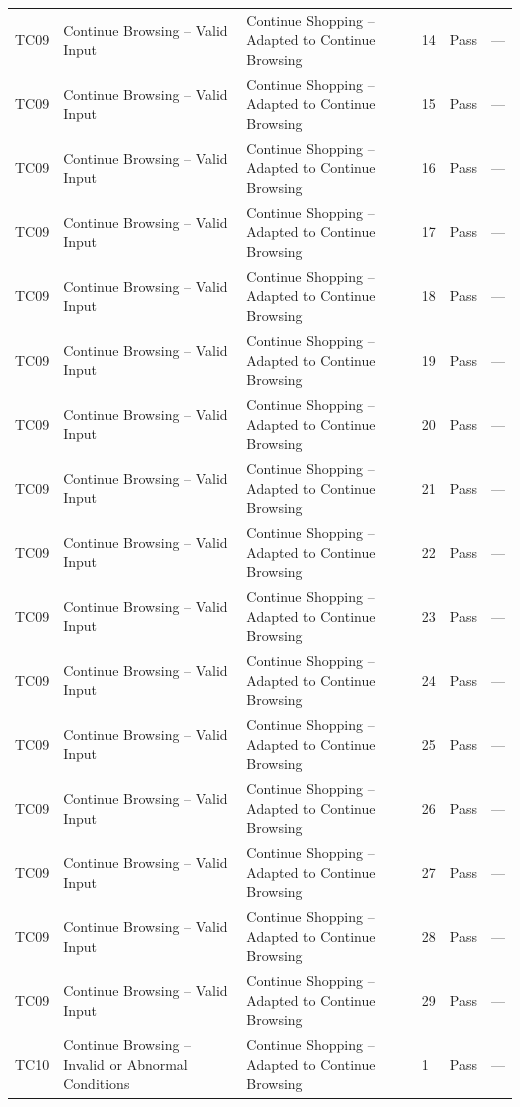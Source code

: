 {\begin{longtable}{@{}p{1.2cm} p{4.2cm} p{4.4cm} p{0.8cm} p{0.9cm} p{1.6cm}@{}}
  TC09 & Continue Browsing -- Valid Input & Continue Shopping -- Adapted to Continue Browsing & 14 & Pass & --- \\
  TC09 & Continue Browsing -- Valid Input & Continue Shopping -- Adapted to Continue Browsing & 15 & Pass & --- \\
  TC09 & Continue Browsing -- Valid Input & Continue Shopping -- Adapted to Continue Browsing & 16 & Pass & --- \\
  TC09 & Continue Browsing -- Valid Input & Continue Shopping -- Adapted to Continue Browsing & 17 & Pass & --- \\
  TC09 & Continue Browsing -- Valid Input & Continue Shopping -- Adapted to Continue Browsing & 18 & Pass & --- \\
  TC09 & Continue Browsing -- Valid Input & Continue Shopping -- Adapted to Continue Browsing & 19 & Pass & --- \\
  TC09 & Continue Browsing -- Valid Input & Continue Shopping -- Adapted to Continue Browsing & 20 & Pass & --- \\
  TC09 & Continue Browsing -- Valid Input & Continue Shopping -- Adapted to Continue Browsing & 21 & Pass & --- \\
  TC09 & Continue Browsing -- Valid Input & Continue Shopping -- Adapted to Continue Browsing & 22 & Pass & --- \\
  TC09 & Continue Browsing -- Valid Input & Continue Shopping -- Adapted to Continue Browsing & 23 & Pass & --- \\
  TC09 & Continue Browsing -- Valid Input & Continue Shopping -- Adapted to Continue Browsing & 24 & Pass & --- \\
  TC09 & Continue Browsing -- Valid Input & Continue Shopping -- Adapted to Continue Browsing & 25 & Pass & --- \\
  TC09 & Continue Browsing -- Valid Input & Continue Shopping -- Adapted to Continue Browsing & 26 & Pass & --- \\
  TC09 & Continue Browsing -- Valid Input & Continue Shopping -- Adapted to Continue Browsing & 27 & Pass & --- \\
  TC09 & Continue Browsing -- Valid Input & Continue Shopping -- Adapted to Continue Browsing & 28 & Pass & --- \\
  TC09 & Continue Browsing -- Valid Input & Continue Shopping -- Adapted to Continue Browsing & 29 & Pass & --- \\
  \midrule
  TC10 & Continue Browsing -- Invalid or Abnormal Conditions & Continue Shopping -- Adapted to Continue Browsing & 1 & Pass & --- \\

\end{longtable}}
